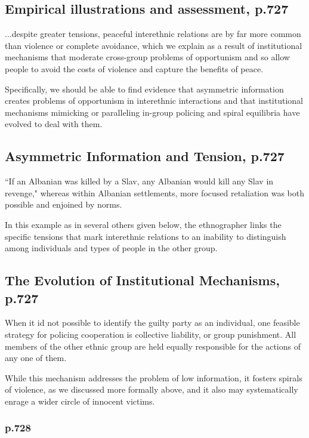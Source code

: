 \documentclass[12pt]{article}
\begin{document}
\subsection{Empirical illustrations and assessment, p.727}

...despite greater tensions, peaceful interethnic relations are by far more
common than violence or complete avoidance, which we explain as a result of
institutional mechanisms that moderate cross-group problems of opportunism and
so allow people to avoid the costs of violence and capture the benefits of
peace.

Specifically, we should be able to find evidence that asymmetric information
creates problems of opportunism in interethnic interactions and that institutional
mechanisms mimicking or paralleling in-group policing and spiral equilibria
have evolved to deal with them.

\subsection{Asymmetric Information and Tension, p.727}

``If an Albanian was killed by a Slav, any Albanian would kill any Slav in
revenge," whereas within Albanian settlements, more focused retaliation was both
possible and enjoined by norms.

In this example as in several others given below, the ethnographer links the
specific tensions that mark interethnic relations to an inability to
distinguish among individuals and types of people in the other group.

\subsection{The Evolution of Institutional Mechanisms, p.727}

When it id not possible to identify the guilty party as an individual, one
feasible strategy for policing cooperation is collective liability, or group
punishment. All members of the other ethnic group are held equally responsible
for the actions of any one of them.

While this mechanism addresses the problem of low information, it fosters
spirals of violence, as we discussed more formally above, and it also may
systematically enrage a wider circle of innocent victims.

\subsubsection{p.728}
\end{document}
